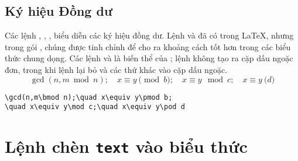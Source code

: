 \section{Ký hiệu Đồng dư}

Các lệnh , , ,  biểu diễn các ký hiệu
đồng dư. Lệnh  và  đã có trong \LaTeX{}, nhưng trong gói
, chúng được tinh chỉnh để cho ra khoảng cách tốt hơn trong
các biểu thức chung dọng. Các lệnh  và  là biến thể của
; lệnh  không tạo ra cặp dấu ngoặc đơn, trong khi lệnh 
 lại bỏ  và các thứ khác vào cặp dấu ngoặc.
\begin{equation}
\gcd(n,m\bmod n);\quad x\equiv y\pmod b;
\quad x\equiv y\mod c;\quad x\equiv y\pod d
\end{equation}
\begin{verbatim}
\gcd(n,m\bmod n);\quad x\equiv y\pmod b;
\quad x\equiv y\mod c;\quad x\equiv y\pod d
\end{verbatim}

\chapter{Lệnh  chèn \texttt{text} vào biểu thức}\label{text}

